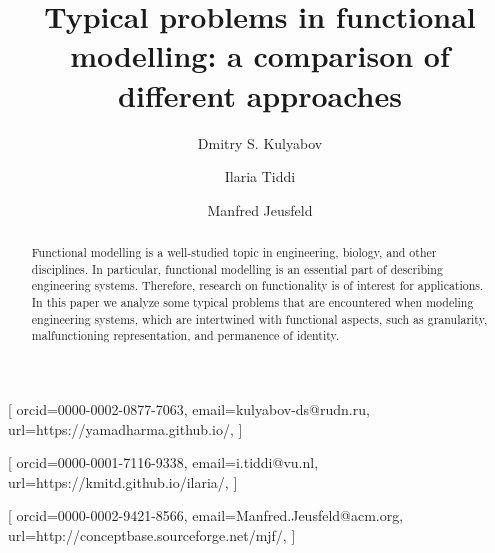 \documentclass[
]{ceurart}
\begin{document}


\title{Typical problems in functional modelling: a comparison of different approaches}

\tnotemark[1]

\author[1,2]{Dmitry S. Kulyabov}[%
orcid=0000-0002-0877-7063,
email=kulyabov-ds@rudn.ru,
url=https://yamadharma.github.io/,
]
\cormark[1]
\fnmark[1]
\address[1]{ISTC-CNR Laboratory for Applied Ontology, via alla cascata 56/C, 38123, Povo, Italy}
\address[2]{Adige S.P.A, via per Barco, 11, Levico Terme, 38056, Italy}

\author[1]{Ilaria Tiddi}[%
orcid=0000-0001-7116-9338,
email=i.tiddi@vu.nl,
url=https://kmitd.github.io/ilaria/,
]
\fnmark[1]

\author[1]{Manfred Jeusfeld}[%
orcid=0000-0002-9421-8566,
email=Manfred.Jeusfeld@acm.org,
url=http://conceptbase.sourceforge.net/mjf/,
]
\fnmark[1]


\begin{abstract}
  Functional modelling is a well-studied topic in engineering, biology, and other disciplines. 
  In particular, functional modelling is an essential part of describing engineering systems.
  Therefore, research on functionality is of interest for applications.
  In this paper we analyze some typical problems that are encountered when modeling engineering systems, which are intertwined with functional aspects, such as granularity, malfunctioning representation, and permanence of identity.\TODO{[S: va sistemato]}
\end{abstract}
\end{document}
